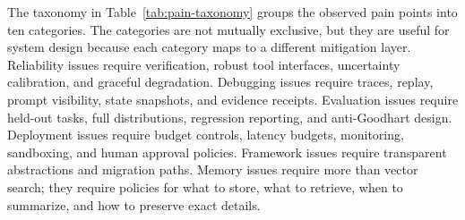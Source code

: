 The taxonomy in Table~\ref{tab:pain-taxonomy} groups the observed pain points into ten categories. The categories are not mutually exclusive, but they are useful for system design because each category maps to a different mitigation layer. Reliability issues require verification, robust tool interfaces, uncertainty calibration, and graceful degradation. Debugging issues require traces, replay, prompt visibility, state snapshots, and evidence receipts. Evaluation issues require held-out tasks, full distributions, regression reporting, and anti-Goodhart design. Deployment issues require budget controls, latency budgets, monitoring, sandboxing, and human approval policies. Framework issues require transparent abstractions and migration paths. Memory issues require more than vector search; they require policies for what to store, what to retrieve, when to summarize, and how to preserve exact details.

